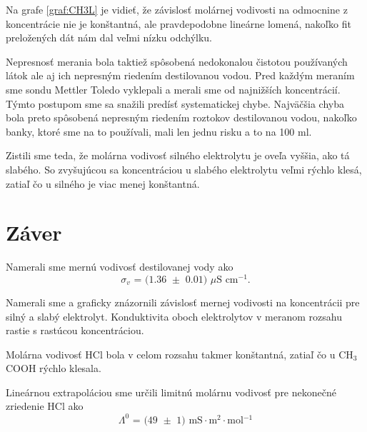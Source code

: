 \documentclass{article}
\begin{document}
Na grafe \ref{graf:CH3L} je vidieť, že závislosť molárnej vodivosti na odmocnine z koncentrácie nie je konštantná, ale pravdepodobne lineárne lomená, nakoľko fit preložených dát nám dal veľmi nízku odchýlku. 

Nepresnosť merania bola taktiež spôsobená nedokonalou čistotou používaných látok ale aj ich nepresným riedením destilovanou vodou. Pred každým meraním sme sondu Mettler Toledo vyklepali a merali sme od najnižších koncentrácií. Týmto postupom sme sa snažili predísť systematickej chybe. Najväčšia chyba bola preto spôsobená nepresným riedením roztokov destilovanou vodou, nakoľko banky, ktoré sme na to používali, mali len jednu risku a to na 100 ml.

Zistili sme teda, že molárna vodivosť silného elektrolytu je oveľa vyššia, ako tá slabého. So zvyšujúcou sa koncentráciou u slabého elektrolytu veľmi rýchlo klesá, zatiaľ čo u silného je viac menej konštantná. 
\section{Záver}

Namerali sme mernú vodivosť destilovanej vody ako 
$$\text{${\sigma}_v$ = (1.36 $\pm$ 0.01) $\mu$S cm$^{-1}$.}$$

Namerali sme a graficky znázornili závislosť mernej vodivosti na koncentrácii pre silný a slabý elektrolyt. Konduktivita oboch elektrolytov v meranom rozsahu rastie s rastúcou koncentráciou.

Molárna vodivosť HCl bola v celom rozsahu takmer konštantná, zatiaľ čo u CH$_3$COOH rýchlo klesala. 

Lineárnou extrapoláciou sme určili limitnú molárnu vodivosť pre nekonečné zriedenie HCl ako 
$$\text{$\Lambda^0$ = (49 $\pm$ 1) mS${\cdot}$m$^2$${\cdot}$mol$^{-1}$}$$

\printbibliography
\end{document}
